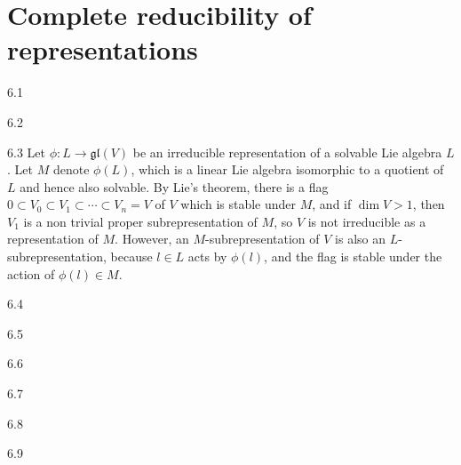 \chapter{Complete reducibility of representations}

\begin{solution}{}{6.1}
    
\end{solution}

\begin{solution}{}{6.2}

\end{solution}

\begin{solution}{}{6.3}
    Let $ \phi: L \to \mathfrak{gl}(V) $ be an irreducible representation of a solvable Lie algebra $ L $. Let $ M $ denote $ \phi(L) $, which is a linear Lie algebra isomorphic to a quotient of $ L $ and hence also solvable. By Lie's theorem, there is a flag $ 0 \subset V_{0} \subset V_{1} \subset \cdots \subset V_{n} = V $ of $ V $ which is stable under $ M $, and if $ \dim V > 1 $, then $ V_{1} $ is a non trivial proper subrepresentation of $ M $, so $ V $ is not irreducible as a representation of $ M $. However, an $ M $-subrepresentation of $ V $ is also an $ L $-subrepresentation, because $ l\in L $ acts by $ \phi(l) $, and the flag is stable under the action of $ \phi(l)\in M $.
\end{solution}

\begin{solution}{}{6.4}

\end{solution}

\begin{solution}{}{6.5}
    
\end{solution}

\begin{solution}{}{6.6}

\end{solution}

\begin{solution}{}{6.7}
    
\end{solution}

\begin{solution}{}{6.8}

\end{solution}

\begin{solution}{}{6.9}
    
\end{solution}